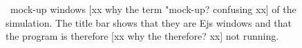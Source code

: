 \begin{figure}[htb]
  \centering
  \caption{\ejs\ mock-up windows [xx why the term "mock-up? confusing xx] of the  simulation. The title bar shows that they are Ejs windows
  and that the program is therefore [xx why the therefore? xx] not running.}
  \label{fig:02EjsIntro/SpringInterface}
\end{figure}

